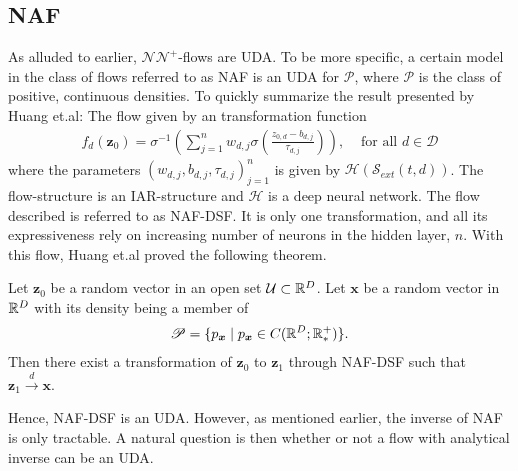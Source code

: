 \subsection{NAF}
As alluded to earlier, \(\mathcal{NN}^{+}\)-flows are UDA. To be more specific, a certain model in the class of flows 
referred to as NAF is an UDA for \(\mathscr{P}\), where \(\mathscr{P}\)
is the class of positive, continuous densities. To quickly summarize the result presented by Huang et.al: The flow given by
an transformation function
\begin{align}\label{eq:naf}
    f_{d}(\bm z_{0}) = \sigma^{-1}\left(\sum_{j=1}^n w_{d,j} \sigma\left(\frac{z_{0,d} - b_{d,j}}{\tau_{d,j}}\right)\right),
    & \text{ for all \(d \in \mathcal{D}\)}
\end{align}
where the parameters \((w_{d,j}, b_{d,j}, \tau_{d,j})^{n}_{j=1}\) is given by \(\mathcal{H}(\mathcal{S}_{ext}(t,d))\).
The flow-structure is an IAR-structure and \(\mathcal{H}\) is a deep neural network. 
The flow described is referred to as NAF-DSF.
It is only one transformation, and all its expressiveness rely on increasing number of 
neurons in the hidden layer, \(n\). With this flow, Huang et.al proved the following theorem.
\begin{theorem}\label{thm:nafUDA}
    Let \(\bm z_0\) be a random vector in an open set \(\mathcal{U} \subset \mathbb{R}^D\).
    Let \(\bm x\) be a random vector in \(\mathbb{R}^D\) with its density being a member of 
    \begin{align*}
        \mathscr{P} = \{p_{\boldsymbol{x}}\mid p_{\boldsymbol{x}}\in C(\mathbb{R}^D;\mathbb{R}_*^{+})\}.
    \end{align*}
    Then there exist a transformation
    of \(\bm z_0\) to \(\bm z_1\) through NAF-DSF such that 
    \(\bm z_1 \xrightarrow{d} \bm x\). 
\end{theorem}
Hence, NAF-DSF is an UDA. However, as mentioned earlier, the inverse of NAF is only tractable. A 
natural question is then whether or not a flow with analytical inverse can be an UDA.

